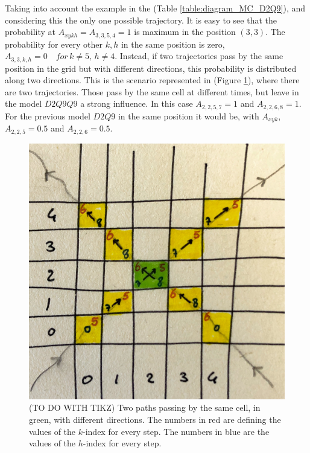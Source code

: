 \documentclass[class=article, crop=false]{standalone}
\begin{document}
Taking into account the example in the (Table \ref{table:diagram_MC_D2Q9}), and considering this the only one possible trajectory.
It is easy to see that the probability at $A_{x y k h} = A_{3, 3, 5, 4} = 1$ is maximum in the position $(3, 3)$.
The probability for every other $k, h$ in the same position is zero, $A_{3, 3, k, h} = 0 \quad for \, k \neq 5, \, h \neq 4$.
Instead, if two trajectories pass by the same position in the grid but with different directions, this probability is distributed along two directions.
This is the scenario represented in (Figure \ref{fig:two_trj_same_cell}), where there are two trajectories.
Those pass by the same cell at different times, but leave in the model $D2Q9Q9$ a strong influence.
In this case $A_{2, 2, 5, 7} = 1$ and $A_{2, 2, 6, 8} = 1$.
For the previous model $D2Q9$ in the same position it would be, with $A_{x y k}$, $A_{2, 2, 5} = 0.5$ and $A_{2, 2, 6} = 0.5$.
\begin{figure}[h]
\centering
\includegraphics[scale=0.1]{draw/eg_distribution_two_trajectories_1}
\captionsetup{width=.7\linewidth}
\caption{(TO DO WITH TIKZ) Two paths passing by the same cell, in green, with different directions.
The numbers in red are defining the values of the $k$-index for every step.
The numbers in blue are the values of the $h$-index for every step.}
\label{fig:two_trj_same_cell}
\end{figure}
\end{document}
